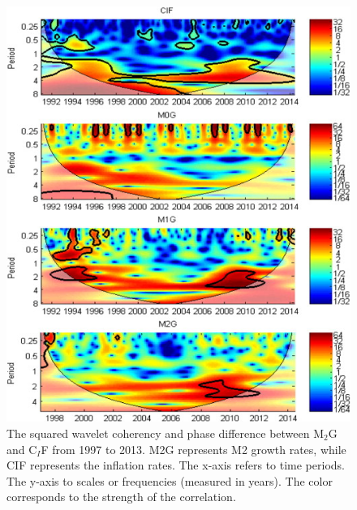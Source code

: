 \documentclass[a4paper,fleqn]{cas-sc}
\begin{document}
\begin{figure}[h]
    \centering
    \includegraphics[]{image/2.jpg}
    \caption{The squared wavelet coherency and phase difference between M$_2$G and C$_I$F from 1997 to 2013. M2G represents M2 growth rates, while CIF represents the inflation rates. The x-axis refers to time periods. The y-axis to scales or frequencies (measured in years). The color corresponds to the strength of the correlation.}
\end{figure}
\end{document}
